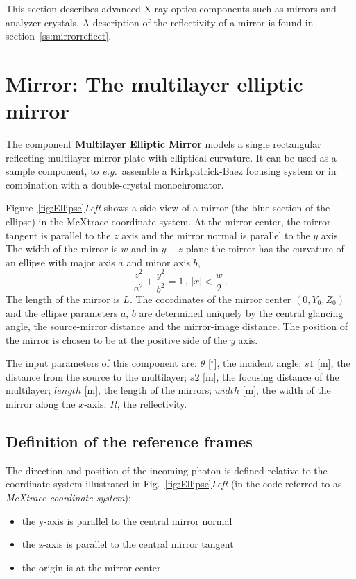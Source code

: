 

This section describes advanced X-ray optics
components such as mirrors and analyzer crystals.
A description of the reflectivity of a mirror is found
in section~\ref{ss:mirrorreflect}.

\section{Mirror: The multilayer elliptic mirror}
\label{s:mirror}

The component {\bf Multilayer Elliptic Mirror}
models a single rectangular reflecting multilayer mirror plate with elliptical curvature. It can be used
as a sample component, to \textit{e.g.}~assemble a Kirkpatrick-Baez focusing system 
or in combination with a double-crystal monochromator.


Figure~\ref{fig:Ellipse}\emph{Left} shows a side view of a mirror
(the blue section of the ellipse) in the McXtrace coordinate system.
At the mirror center, the mirror tangent is parallel to the $z$ axis
and the mirror normal is parallel to the $y$ axis. The width of the
mirror is $w$ and in $y-z$ plane the mirror has the curvature of an
ellipse with major axis $a$ and minor axis $b$,
%
\begin{equation} 
\frac{z^2}{ a^2} + \frac{y^2}{b^2} =1\,, \,|x| <
\frac{w}{2}\,.
\end{equation}
%
The length of the mirror is $L$. The coordinates of the mirror
center $(0,Y_0,Z_0)$ and the ellipse parameters $a$, $b$ are
determined uniquely by the central glancing angle, the source-mirror
distance and the mirror-image distance. The position of the mirror
is chosen to be at the positive side of the $y$ axis.

The input parameters of this component are:
$\theta$ [$^{\circ}$], the incident angle; 
$s1$ [m], the distance from the source to the multilayer;
$s2$ [m], the focusing distance of the multilayer;
$length$ [m], the length of the mirrors;
$width$ [m], the width of the mirror along the $x$-axis;
$R$, the reflectivity.

\subsection{Definition of the reference frames}
The direction and position of the incoming photon is defined
relative to the coordinate system illustrated in
Fig.~\ref{fig:Ellipse}\emph{Left} (in the code referred to as
\emph{McXtrace coordinate system}):
\begin{itemize}
\item the y-axis is parallel to the central mirror normal
\item the z-axis is parallel to the central mirror tangent
\item the origin is at the mirror center
\end{itemize}

